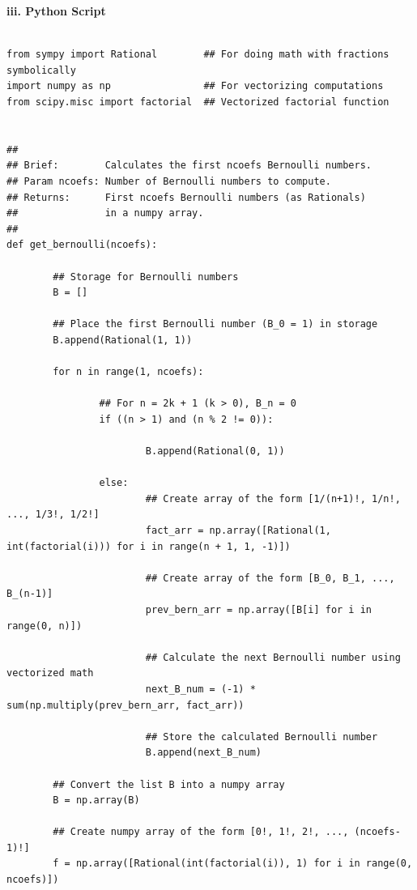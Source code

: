\documentclass{article}
\begin{document}
\pagebreak

\noindent\begin{large}\textbf{iii. Python Script}\end{large}

\begin{lstlisting}

from sympy import Rational        ## For doing math with fractions symbolically
import numpy as np                ## For vectorizing computations
from scipy.misc import factorial  ## Vectorized factorial function


##
## Brief:        Calculates the first ncoefs Bernoulli numbers.
## Param ncoefs: Number of Bernoulli numbers to compute.        
## Returns:      First ncoefs Bernoulli numbers (as Rationals) 
##               in a numpy array.
##
def get_bernoulli(ncoefs):

        ## Storage for Bernoulli numbers
        B = []
        
        ## Place the first Bernoulli number (B_0 = 1) in storage
        B.append(Rational(1, 1))

        for n in range(1, ncoefs):
                
                ## For n = 2k + 1 (k > 0), B_n = 0
                if ((n > 1) and (n % 2 != 0)):
                    
                        B.append(Rational(0, 1))
                        
                else:
                        ## Create array of the form [1/(n+1)!, 1/n!, ..., 1/3!, 1/2!]
                        fact_arr = np.array([Rational(1, int(factorial(i))) for i in range(n + 1, 1, -1)])
                        
                        ## Create array of the form [B_0, B_1, ..., B_(n-1)]
                        prev_bern_arr = np.array([B[i] for i in range(0, n)])
                        
                        ## Calculate the next Bernoulli number using vectorized math
                        next_B_num = (-1) * sum(np.multiply(prev_bern_arr, fact_arr))
                        
                        ## Store the calculated Bernoulli number
                        B.append(next_B_num)
        
        ## Convert the list B into a numpy array
        B = np.array(B)
        
        ## Create numpy array of the form [0!, 1!, 2!, ..., (ncoefs-1)!]
        f = np.array([Rational(int(factorial(i)), 1) for i in range(0, ncoefs)])
        

\end{lstlisting}
\end{document}
